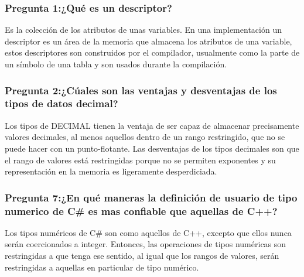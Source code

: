 \subsubsection{Pregunta 1:¿Qué es un descriptor?}
Es la colección de los atributos de unas variables.
En una implementación un descriptor es un área de la memoria que almacena los atributos de una variable, estos descriptores son construidos por el compilador, usualmente como la parte de un símbolo de una tabla y son usados durante la compilación.
\subsubsection{Pregunta 2:¿Cúales son las ventajas y desventajas de los tipos de datos decimal?}
Los tipos de DECIMAL tienen la ventaja de ser capaz de almacenar precisamente valores decimales, al menos aquellos dentro de un rango restringido, que no se puede hacer con un punto-flotante.
Las desventajas de los tipos decimales son que el rango  de valores está restringidas porque no se permiten exponentes y su representación en la memoria es ligeramente desperdiciada.
\subsubsection{Pregunta 7:¿En qué maneras la definición de usuario de tipo numerico de C\# es mas confiable que aquellas de C++?}
Los tipos numéricos de C\# son como aquellos de C++, excepto que ellos nunca serán coercionados a integer. Entonces, las operaciones de tipos numéricas son restringidas a que tenga ese sentido, al igual que los rangos de valores, serán restringidas a aquellas en particular de tipo numérico.